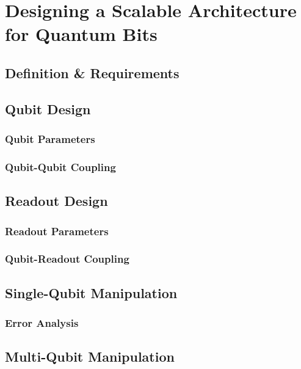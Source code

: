 \chapter{Designing a Scalable Architecture for Quantum Bits} \label{chapter:scalable_architecture}

\cite{galiautdinov_resonator/zero-qubit_2011,mariantoni_implementing_2011}

\section{Definition \& Requirements}

\section{Qubit Design}

\subsection{Qubit Parameters}

\subsection{Qubit-Qubit Coupling}

\section{Readout Design}

\subsection{Readout Parameters}

\subsection{Qubit-Readout Coupling}

\section{Single-Qubit Manipulation}

\subsection{Error Analysis}

\section{Multi-Qubit Manipulation}

